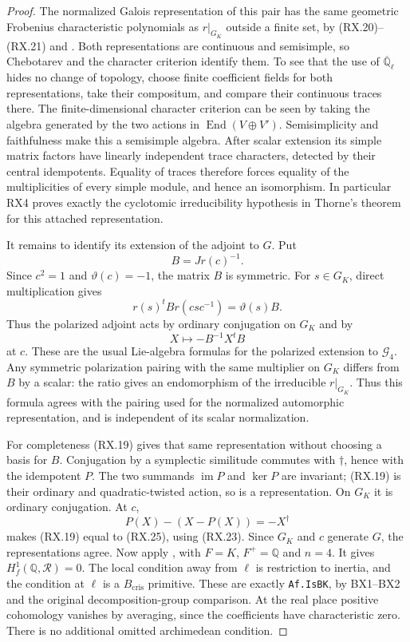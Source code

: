 \begin{proof}
The normalized Galois representation of this pair has the same
geometric Frobenius characteristic polynomials as $r|_{G_K}$
outside a finite set, by (RX.20)--(RX.21) and
\cite[Theorem~2.1.1]{RX-BLGGT}.
Both representations are continuous and semisimple, so Chebotarev
\cite[Theorem~8.31]{RX-Milne}
and the character criterion identify them.  To see that the use
of $\overline{\mathbb Q}_\ell$ hides no change of topology,
choose finite coefficient fields for both representations, take
their compositum, and compare their continuous traces there.
The finite-dimensional character criterion can be seen by taking the
algebra generated by the two actions in
$\operatorname{End}(V\oplus V')$.  Semisimplicity and faithfulness
make this a semisimple algebra.  After scalar extension its simple
matrix factors have linearly independent trace characters, detected
by their central idempotents.  Equality of traces therefore forces
equality of the multiplicities of every simple module, and hence
an isomorphism.  In particular RX4 proves exactly the
cyclotomic irreducibility hypothesis in Thorne's theorem for this
attached representation.

It remains to identify its extension of the adjoint to $G$.
Put
\[
                            B=Jr(c)^{-1}.
 \tag{RX.23}
\]
Since $c^2=1$ and $\vartheta(c)=-1$, the matrix $B$ is symmetric.
For $s\in G_K$, direct multiplication gives
\[
         r(s)^t B r(csc^{-1})=\vartheta(s)B.
 \tag{RX.24}
\]
Thus the polarized adjoint acts by ordinary conjugation on $G_K$
and by
\[
                           X\longmapsto-B^{-1}X^tB
 \tag{RX.25}
\]
at $c$.  These are the usual Lie-algebra formulas for the polarized
extension to $\mathcal G_4$.  Any symmetric polarization pairing
with the same multiplier on $G_K$ differs from $B$ by a scalar:
the ratio gives an endomorphism of the irreducible $r|_{G_K}$.
Thus this formula agrees with the pairing used for the normalized
automorphic representation, and is independent of its scalar
normalization.

For completeness (RX.19) gives that same representation without
choosing a basis for $B$.  Conjugation by a symplectic similitude
commutes with $\dagger$, hence with the idempotent $P$.
The two summands $\operatorname{im}P$ and $\ker P$ are invariant;
(RX.19) is their ordinary and quadratic-twisted action, so is a
representation.  On $G_K$ it is ordinary conjugation.  At $c$,
\[
 P(X)-(X-P(X))=-X^\dagger
\]
makes (RX.19) equal to (RX.25), using (RX.23).
Since $G_K$ and $c$ generate $G$, the representations agree.
Now apply \cite[Theorem~6.1]{RX-Thorne}, with $F=K$, $F^+=\mathbb Q$
and $n=4$.  It gives $H^1_f(\mathbb Q,\mathcal R)=0$.
The local condition away from $\ell$ is restriction to inertia,
and the condition at $\ell$ is a $B_{\mathrm{cris}}$ primitive.
These are exactly \texttt{Af.IsBK}, by BX1--BX2 and the original
decomposition-group comparison.  At the real place positive
cohomology vanishes by averaging, since the coefficients have
characteristic zero.  There is no additional omitted archimedean
condition.


\end{proof}
